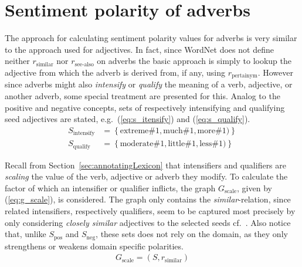 \section{Sentiment polarity of adverbs}
\label{sec:sentimentAdverb}
The approach for calculating sentiment polarity values for adverbs is very similar to the approach used for adjectives. In fact, since WordNet does not define neither $r_\mathrm{similar}$ nor $r_\mathrm{see\text{-}also}$ on adverbs the basic approach is simply to lookup the adjective from which the adverb is derived from, if any, using $r_\mathrm{pertainym}$. However since adverbs might also \emph{intensify} or \emph{qualify} the meaning of a verb, adjective, or another adverb, some special treatment are presented for this. Analog to the positive and negative concepts, sets of respectively intensifying and qualifying seed adjectives are stated, e.g.\ (\ref{eq:s_itensify}) and (\ref{eq:s_qualify}).
\begin{align}
	S_\mathrm{intensify} &= \left\{ \text{extreme}\#1, \text{much}\#1, \text{more}\#1)\right\} \label{eq:s_itensify}\\
	S_\mathrm{qualify} &= \left\{ \text{moderate}\#1, \text{little}\#1, \text{less}\#1) \right\} \label{eq:s_qualify}
\end{align}

Recall from Section~\ref{sec:annotatingLexicon} that intensifiers and qualifiers are \emph{scaling} the value of the verb, adjective or adverb they modify. To calculate the factor of which an intensifier or qualifier inflicts, the graph $G_\mathrm{scale}$, given by (\ref{eq:g_scale}), is considered. The graph only contains the \emph{similar}-relation, since related intensifiers, respectively qualifiers, seem to be captured most precisely by only considering \emph{closely similar} adjectives to the selected seeds cf.\ \cite{valenceShifting}. Also notice that, unlike $S_\mathrm{pos}$ and $S_\mathrm{neg}$, these sets does not rely on the domain, as they only strengthens or weakens domain specific polarities. 
\begin{align}
	G_\mathrm{scale} = (S, r_\mathrm{similar})
	\label{eq:g_scale}
\end{align}


